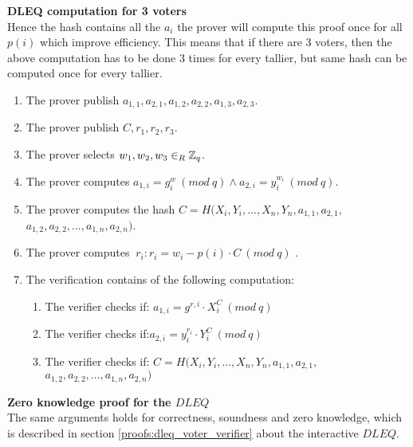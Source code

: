 \noindent 
\textbf{DLEQ computation for 3 voters}\\
Hence the hash contains all the  \begin{math}a_i \end{math} the prover will compute this proof once for all  \begin{math}p(i) \end{math} which improve efficiency. This means that if there are 3 voters, then the above computation has to be done 3 times for every tallier, but same hash can be computed once for every tallier. 



\begin{enumerate}
    \item The prover publish $a_{1,1},a_{2,1},a_{1,2},a_{2,2},a_{1,3},a_{2,3}$.
    \item The prover publish $C,r_1,r_2,r_3$.
    \item The prover selects  $w_1, w_2,w_3\in_R \mathbb{Z}_q$.
    \item The prover computes $a_{1,i}=g^w_i \ (mod\ q) \land a_{2,i}=y_i^{w_i} \ (mod\ q)$.
    \item The prover computes the hash  $C=H(X_i,Y_i,...,X_n,Y_n,a_{1,1},a_{2,1},$\\
$a_{1,2},a_{2,2},...,a_{1,n},a_{2,n})$.
    \item The prover computes $\ r_i:  r_i=w_i-p(i)  \cdot  C \ (mod\ q)$ .
    \item The verification contains of the following computation:
    \begin{enumerate}        
        \item The verifier checks if: $a_{1,i} = g^{r,i} \cdot X_i^C \ (mod\ q) $
        \item The verifier checks if:$a_{2,i} =y_i^{r_{i}}  \cdot  Y_i^C \ (mod\ q)  $ 
         \item The verifier checks if: $C=H(X_i,Y_i,...,X_n,Y_n,a_{1,1},a_{2,1},$\\
$a_{1,2},a_{2,2},...,a_{1,n},a_{2,n})$
    \end{enumerate}
\end{enumerate}



\noindent
\textbf{Zero knowledge proof for the $DLEQ$}\\
The same arguments holds for correctness, soundness and zero knowledge, which is described in section \ref{proofs:dleq_voter_verifier} about the interactive $DLEQ$. 

